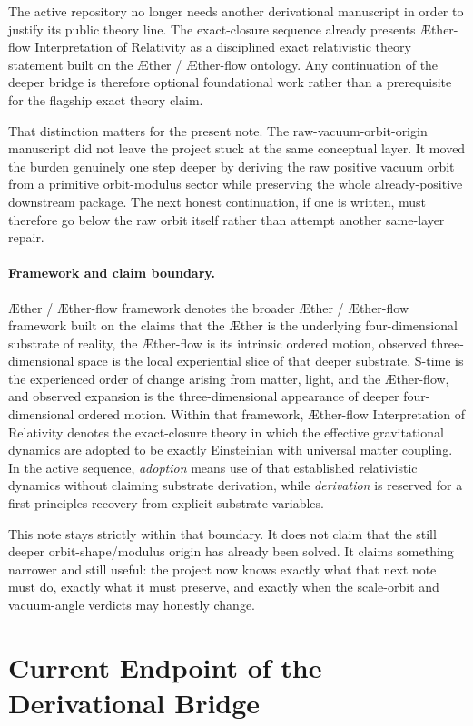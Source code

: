 \documentclass[11pt]{article}
\newcommand{\Aether}{\AE{}ther}
\newcommand{\Aflow}{\AE{}ther-flow}
\newcommand{\TheoryName}{\Aflow{} Interpretation of Relativity}
\newcommand{\TheoryProgram}{\Aether{} / \Aflow{} framework}
\begin{document}
The active repository no longer needs another derivational manuscript in order to justify its public theory line. The exact-closure sequence already presents \TheoryName{} as a disciplined exact relativistic theory statement built on the \Aether{} / \Aflow{} ontology. Any continuation of the deeper bridge is therefore optional foundational work rather than a prerequisite for the flagship exact theory claim.

That distinction matters for the present note. The raw-vacuum-orbit-origin manuscript did not leave the project stuck at the same conceptual layer. It moved the burden genuinely one step deeper by deriving the raw positive vacuum orbit from a primitive orbit-modulus sector while preserving the whole already-positive downstream package. The next honest continuation, if one is written, must therefore go below the raw orbit itself rather than attempt another same-layer repair.

\paragraph{Framework and claim boundary.}
\TheoryProgram{} denotes the broader \Aether{} / \Aflow{} framework built on the claims that the \Aether{} is the underlying four-dimensional substrate of reality, the \Aflow{} is its intrinsic ordered motion, observed three-dimensional space is the local experiential slice of that deeper substrate, S-time is the experienced order of change arising from matter, light, and the \Aflow{}, and observed expansion is the three-dimensional appearance of deeper four-dimensional ordered motion. Within that framework, \TheoryName{} denotes the exact-closure theory in which the effective gravitational dynamics are adopted to be exactly Einsteinian with universal matter coupling. In the active sequence, \emph{adoption} means use of that established relativistic dynamics without claiming substrate derivation, while \emph{derivation} is reserved for a first-principles recovery from explicit substrate variables.

This note stays strictly within that boundary. It does not claim that the still deeper orbit-shape/modulus origin has already been solved. It claims something narrower and still useful: the project now knows exactly what that next note must do, exactly what it must preserve, and exactly when the scale-orbit and vacuum-angle verdicts may honestly change.

\section{Current Endpoint of the Derivational Bridge}
\end{document}
